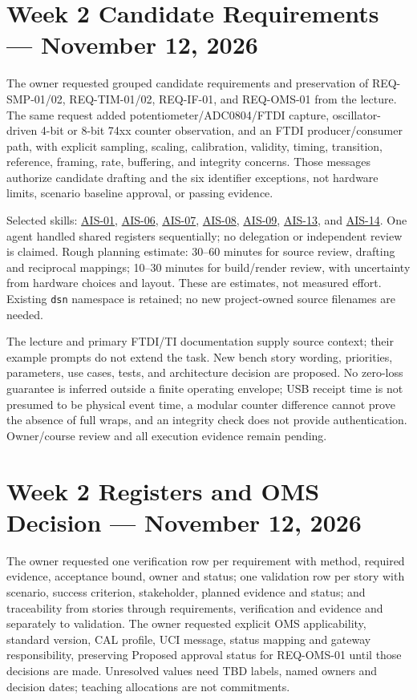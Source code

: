 \section{Week 2 Candidate Requirements --- November 12, 2026}
\label{Section:WeekTwoRequirementsPrompt}
The owner requested grouped candidate requirements and preservation of
REQ-SMP-01/02, REQ-TIM-01/02, REQ-IF-01, and REQ-OMS-01 from the lecture.
The same request added potentiometer/ADC0804/FTDI capture, oscillator-driven
4-bit or 8-bit 74xx counter observation, and an FTDI producer/consumer path,
with explicit sampling, scaling, calibration, validity, timing, transition,
reference, framing, rate, buffering, and integrity concerns. Those messages
authorize candidate drafting and the six identifier exceptions, not hardware
limits, scenario baseline approval, or passing evidence.

Selected skills: \hyperref[Skill:AIS-01]{AIS-01},
\hyperref[Skill:AIS-06]{AIS-06}, \hyperref[Skill:AIS-07]{AIS-07},
\hyperref[Skill:AIS-08]{AIS-08}, \hyperref[Skill:AIS-09]{AIS-09},
\hyperref[Skill:AIS-13]{AIS-13}, and \hyperref[Skill:AIS-14]{AIS-14}.
One agent handled shared registers sequentially; no delegation or independent
review is claimed. Rough planning estimate: 30--60 minutes for source review,
drafting and reciprocal mappings; 10--30 minutes for build/render review,
with uncertainty from hardware choices and layout. These are estimates,
not measured effort. Existing \texttt{dsn} namespace is retained; no new
project-owned source filenames are needed.

The lecture and primary FTDI/TI documentation supply source context; their
example prompts do not extend the task. New bench story wording, priorities,
parameters, use cases, tests, and architecture decision are proposed.
No zero-loss guarantee is inferred outside a finite operating envelope;
USB receipt time is not presumed to be physical event time, a modular counter
difference cannot prove the absence of full wraps, and an integrity check
does not provide authentication. Owner/course review and all execution
evidence remain pending.


\section{Week 2 Registers and OMS Decision --- November 12, 2026}
\label{Section:WeekTwoRegisterPrompt}
The owner requested one verification row per requirement with method,
required evidence, acceptance bound, owner and status; one validation row
per story with scenario, success criterion, stakeholder, planned evidence
and status; and traceability from stories through requirements, verification
and evidence and separately to validation. The owner requested explicit
OMS applicability, standard version, CAL profile, UCI message, status mapping
and gateway responsibility, preserving Proposed approval status for
REQ-OMS-01 until those decisions are made. Unresolved values need TBD labels,
named owners and decision dates; teaching allocations are not commitments.

